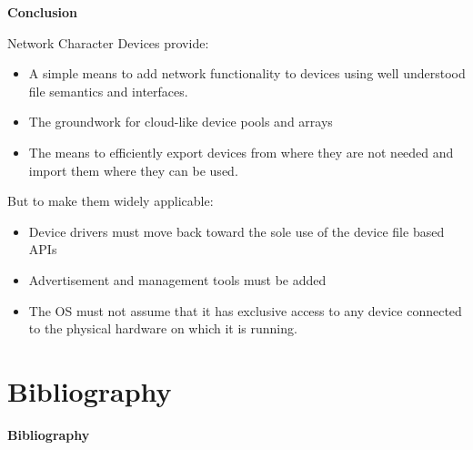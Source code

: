 \documentclass[handout]{beamer}
\begin{document}
\begin{frame}{\bf Conclusion}

Network Character Devices provide:

\begin{itemize}
\item<1-> A simple means to add network functionality to devices using
  well understood file semantics and interfaces.
\item<2-> The groundwork for cloud-like device pools and arrays
\item<3-> The means to efficiently export devices from where they are not
  needed and import them where they can be used.
\end{itemize}

But to make them widely applicable:

\begin{itemize}
\item<4-> Device drivers must move back toward the sole use of the
  device file based APIs
\item<5-> Advertisement and management tools must be added
\item<6-> The OS must not assume that it has exclusive access to any
  device connected to the physical hardware on which it is running.
\end{itemize}

\end{frame}

\section{Bibliography}

\begin{frame}[t,allowframebreaks]{\bf Bibliography}
\nocite{*}

\end{frame}
\end{document}
